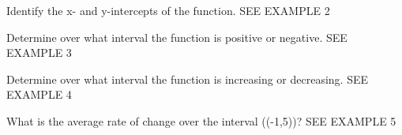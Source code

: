 \documentclass{article}
\newenvironment{practice}[2]{}{}        %
\newcommand{\answer}[1]{}               %
\newcommand{\te}[1]{}                   %
\begin{document}
\begin{practice}{24}{1}
Identify the x- and y-intercepts of the function. SEE EXAMPLE 2
\te{Use the shared graph printed above Exercise 23.}
\answer{x-intercepts: (-5), 3; y-intercept: 1.5}
\end{practice}
\begin{practice}{25}{1}
Determine over what interval the function is positive or negative. SEE EXAMPLE 3
\te{Use the shared graph printed above Exercise 23.}
\answer{positive: ((-5,3)); negative: ((3,5])}
\end{practice}
\begin{practice}{26}{1}
Determine over what interval the function is increasing or decreasing. SEE EXAMPLE 4
\te{Use the shared graph printed above Exercise 23.}
\answer{increasing: ([-5,-1)); decreasing: ((-1,5])}
\end{practice}
\begin{practice}{27}{1}
What is the average rate of change over the interval ((-1,5))? SEE EXAMPLE 5
\te{Use the shared graph printed above Exercise 23.}
\answer{(-\frac{1}{2})}
\end{practice}
\end{document}
